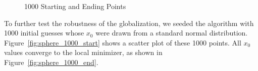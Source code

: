  \begin{figure}[H]
  \centering
  \hspace{1em}
   \caption{1000 Starting and Ending Points \label{fig:sphere_1000}}  
\end{figure}

To further test the robustness of the globalization, we seeded the algorithm with 1000 initial guesses whose $x_0$ were drawn from a standard normal distribution. Figure~\ref{fig:sphere_1000_start} shows a scatter plot of these 1000 points.  All $x_0$ values converge to the local minimizer, as shown in Figure~\ref{fig:sphere_1000_end}.  

